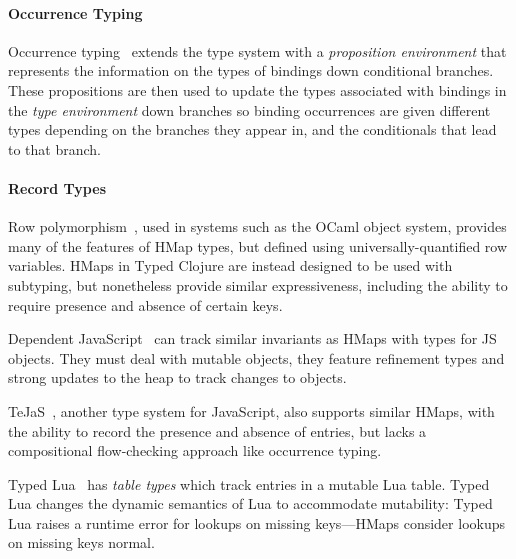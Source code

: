 \documentclass[9pt]{extarticle}
\begin{document}

\paragraph{Occurrence Typing} 
Occurrence typing~\cite{TF08,TF10} extends the type 
system with a \emph{proposition environment} that represents 
the information on the types of bindings down conditional branches.
These propositions are then used to update the types associated
with bindings in the \emph{type environment} down branches
so binding occurrences are given different types 
depending on the branches they appear in, and the conditionals
that lead to that branch.





\paragraph{Record Types} Row polymorphism~\cite{Wand89typeinference,CM91,HP91}, used
in systems such as the OCaml object system, provides many of the
features of HMap types, but defined using universally-quantified row
variables. HMaps in Typed Clojure are instead designed to be used with
subtyping, but nonetheless provide similar expressiveness, including
the ability to require presence and absence of certain keys. 

Dependent JavaScript~\cite{Chugh:2012:DTJ} can track similar
invariants as HMaps with types for JS objects. They must deal with
mutable objects, they feature refinement types and strong updates to
the heap to track changes to objects.

TeJaS~\cite{TeJaS}, another type system for JavaScript,
also supports similar HMaps, with the ability to
record the presence and absence of entries, but lacks a compositional
flow-checking approach like occurrence typing.

Typed Lua~\cite{Maidl:2014:TLO} has \emph{table types} which track
entries in a mutable Lua table.  Typed Lua changes the dynamic
semantics of Lua to accommodate mutability: Typed Lua raises a runtime
error for lookups on missing keys---HMaps consider lookups on missing
keys normal.
\end{document}
